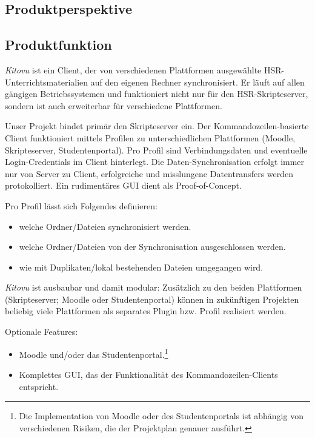 \documentclass[a4paper]{article}
\begin{document}
\subsection{Produktperspektive}

\subsection{Produktfunktion}
\emph{Kitovu} ist ein Client, der von verschiedenen Plattformen ausgewählte HSR-Unterrichtsmaterialien auf den eigenen Rechner synchronisiert. Er läuft auf allen gängigen Betriebssystemen und funktioniert nicht nur für den HSR-Skripteserver, sondern ist auch erweiterbar für verschiedene Plattformen.

Unser Projekt bindet primär den Skripteserver ein. Der Kommandozeilen-basierte Client funktioniert mittels Profilen zu unterschiedlichen Plattformen (Moodle, Skripteserver, Studentenportal). Pro Profil sind Verbindungsdaten und eventuelle Login-Credentials im Client hinterlegt. Die Daten-Synchronisation erfolgt immer nur von Server zu Client, erfolgreiche und misslungene Datentransfers werden protokolliert. Ein rudimentäres GUI dient als Proof-of-Concept.

Pro Profil lässt sich Folgendes definieren:

\begin{itemize}
	\item welche Ordner/Dateien synchronisiert werden.
	\item welche Ordner/Dateien von der Synchronisation ausgeschlossen werden.
	\item wie mit Duplikaten/lokal bestehenden Dateien umgegangen wird.
\end{itemize}

\emph{Kitovu} ist ausbaubar und damit modular: Zusätzlich zu den beiden Plattformen (Skripteserver; Moodle oder Studentenportal) können in zukünftigen Projekten beliebig viele Plattformen als separates Plugin bzw. Profil realisiert werden.

Optionale Features:

\begin{itemize}
	\item Moodle und/oder das Studentenportal.\footnote{Die Implementation von Moodle oder des Studentenportals ist abhängig von verschiedenen Risiken, die der Projektplan genauer ausführt.} 
	\item Komplettes GUI, das der Funktionalität des Kommandozeilen-Clients entspricht.
\end{itemize}
\end{document}
